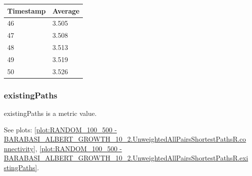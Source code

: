 \begin{tabular}{|l||l|}
\hline
	\textbf{Timestamp} & \textbf{Average} \\ \hline
	46 & 3.505 \\ \hline
	47 & 3.508 \\ \hline
	48 & 3.513 \\ \hline
	49 & 3.519 \\ \hline
	50 & 3.526 \\ \hline
\end{tabular}

\subsubsection{existingPaths}
existingPaths is a metric value.

See plots: \ref{plot:RANDOM_100_500 - BARABASI_ALBERT_GROWTH_10_2.UnweightedAllPairsShortestPathsR.connectivity}, \ref{plot:RANDOM_100_500 - BARABASI_ALBERT_GROWTH_10_2.UnweightedAllPairsShortestPathsR.existingPaths}.


